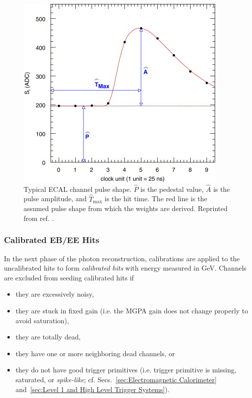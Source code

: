 \documentclass[dissertation.tex]{subfiles}
\begin{document}
\begin{figure}
	\centering
	\includegraphics[scale=4.0]{pulse}
	\caption{Typical ECAL channel pulse shape.  $\widehat{P}$ is the pedestal value, $\widehat{A}$ is the pulse amplitude, and $\widehat{T}_{\mathrm{max}}$ is the hit time.  The red line is the assumed pulse shape from which the weights are derived.  Reprinted from ref. \cite{Bruneliere200733}.}
	\label{fig:pulse}
\end{figure}

\subsubsection{Calibrated EB/EE Hits}
\label{sec:Calibrated EB/EE Hits}

In the next phase of the photon reconstruction, calibrations are applied to the uncalibrated hits to form \textit{calibrated hits} with energy measured in GeV.  Channels are excluded from seeding calibrated hits if

\begin{itemize}
\item they are excessively noisy,
\item they are stuck in fixed gain (i.e. the MGPA gain does not change properly to avoid saturation),
\item they are totally dead,
\item they have one or more neighboring dead channels, or
\item they do not have good trigger primitives (i.e. trigger primitive is missing, saturated, or \textit{spike-like}; cf. Secs.~\ref{sec:Electromagnetic Calorimeter} and~\ref{sec:Level 1 and High Level Trigger Systems}).
\end{itemize}
\end{document}
